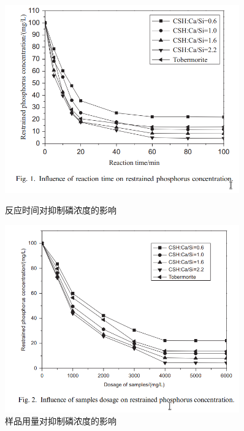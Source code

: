\documentclass[11pt]{article}
\begin{document}
\begin{figure}
    \centering
    \begin{minipage}{0.45\textwidth}
        \centering
        \includegraphics[width=0.9\textwidth]{fig.1.png} %
        \caption{反应时间对抑制磷浓度的影响}
    \end{minipage}\hfill
    \begin{minipage}{0.45\textwidth}
        \centering
        \includegraphics[width=0.9\textwidth]{fig.2.png} %
        \caption{样品用量对抑制磷浓度的影响}
    \end{minipage}
\end{figure}
\end{document}
